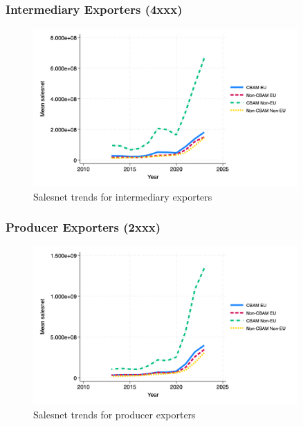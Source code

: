 \documentclass{article}
\begin{document}
\subsubsection{Intermediary Exporters (4xxx)}
\begin{figure}[h!]
\centering
\includegraphics[width=0.9\textwidth]{salesnet_ei.png}
\caption{Salesnet trends for intermediary exporters}
\label{fig:salesnet_ei}
\end{figure}

\subsubsection{Producer Exporters (2xxx)}
\begin{figure}[h!]
\centering
\includegraphics[width=0.9\textwidth]{salesnet_ep.png}
\caption{Salesnet trends for producer exporters}
\label{fig:salesnet_ep}
\end{figure}
\end{document}
